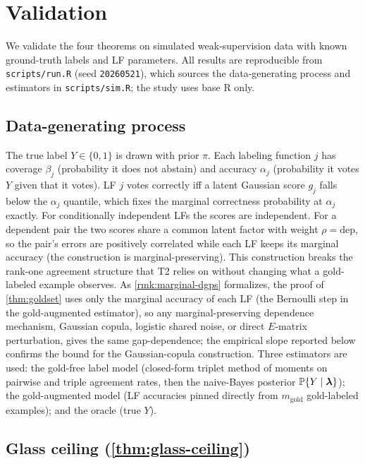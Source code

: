 \section{Validation}
\label{sec:validation}

We validate the four theorems on simulated weak-supervision data with
known ground-truth labels and LF parameters. All results are
reproducible from \texttt{scripts/run.R} (seed \texttt{20260521}),
which sources the data-generating process and estimators in
\texttt{scripts/sim.R}; the study uses base R only.

\subsection{Data-generating process}

The true label $Y \in \{0,1\}$ is drawn with prior $\pi$. Each
labeling function $j$ has coverage $\beta_j$ (probability it does not
abstain) and accuracy $\alpha_j$ (probability it votes $Y$ given that
it votes). LF $j$ votes correctly iff a latent Gaussian score
$g_j$ falls below the $\alpha_j$ quantile, which fixes the marginal
correctness probability at $\alpha_j$ exactly. For conditionally
independent LFs the scores are independent. For a dependent pair the
two scores share a common latent factor with weight
$\rho = \mathrm{dep}$, so the pair's errors are positively
correlated while each LF keeps its marginal accuracy
(the construction is marginal-preserving). This
construction breaks the rank-one agreement structure that T2 relies
on without changing what a gold-labeled example observes. As
\cref{rmk:marginal-dgps} formalizes, the proof of \cref{thm:goldset}
uses only the marginal accuracy of each LF (the Bernoulli step in
the gold-augmented estimator), so any marginal-preserving dependence
mechanism, Gaussian copula, logistic shared noise, or direct
$E$-matrix perturbation, gives the same gap-dependence; the
empirical slope reported below confirms the bound for the
Gaussian-copula construction. Three
estimators are used: the gold-free label model (closed-form triplet
method of moments on pairwise and triple agreement rates, then the
naive-Bayes posterior $\mathbb{P}\{Y \mid \bm{\lambda}\}$); the
gold-augmented model (LF accuracies pinned directly from
$m_{\mathrm{gold}}$ gold-labeled examples); and the oracle (true
$Y$).

\subsection{Glass ceiling (\cref{thm:glass-ceiling})}

